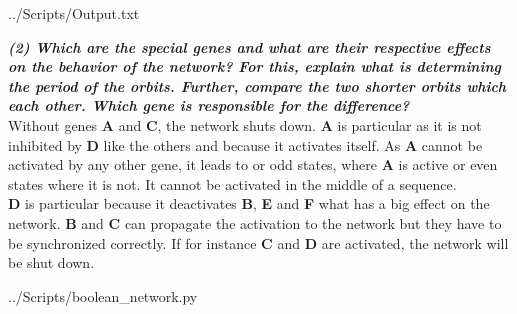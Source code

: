 \documentclass[10pt,a4paper]{article}
\begin{document}
\begin{enumerate}
\newpage
 {../Scripts/Output.txt}


\textbf{\textit{(2) Which are the special genes and what are their respective effects on the behavior of the
		network? For this, explain what is determining the period of the orbits. Further, compare
		the two shorter orbits which each other. Which gene is responsible for the difference?}}\\
	
	Without genes \textbf{A} and \textbf{C}, the network shuts down. \textbf{A} is particular as it is not inhibited by \textbf{D} like the others and because it activates itself. As \textbf{A} cannot be activated by any other gene, it leads to or odd states, where \textbf{A} is active or even states where it is not. It cannot be activated in the middle of a sequence. \\
	
	
	\textbf{D} is particular because it deactivates \textbf{B}, \textbf{E} and \textbf{F} what has a big effect on the network. \textbf{B} and \textbf{C} can propagate the activation to the network but they have to be synchronized correctly. If for instance \textbf{C} and \textbf{D} are activated, the network will be shut down. 
	
	



\end{enumerate}


\newpage
 {../Scripts/boolean\string_network.py}
\end{document}
